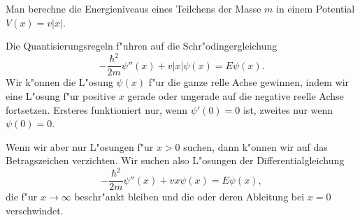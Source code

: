 Man berechne die Energieniveaus eines Teilchens der Masse $m$ in einem
Potential $V(x)=v|x|$.

\begin{loesung}
Die Quantisierungsregeln f"uhren auf die Schr"odingergleichung
\[
-\frac{\hbar^2}{2m}\psi''(x)+v|x|\psi(x)=E\psi(x).
\]
Wir k"onnen die L"osung $\psi(x)$ f"ur die ganze relle Achse gewinnen,
indem wir eine L"osung f"ur positive $x$ gerade oder ungerade
auf die negative reelle Achse fortsetzen. 
Ersteres funktioniert nur, wenn $\psi'(0)=0$ ist, zweites nur
wenn $\psi(0)=0$.

Wenn wir aber nur L"osungen f"ur $x>0$ suchen, dann k"onnen wir
auf das Betragszeichen verzichten.
Wir suchen also L"osungen der Differentialgleichung
\begin{equation}
-\frac{\hbar^2}{2m}\psi''(x)+vx \psi(x)=E\psi(x),
\label{06002:dgl}
\end{equation}
die f"ur $x\to\infty$ beschr"ankt bleiben und die oder deren Ableitung
bei $x=0$ verschwindet.


\end{loesung}
